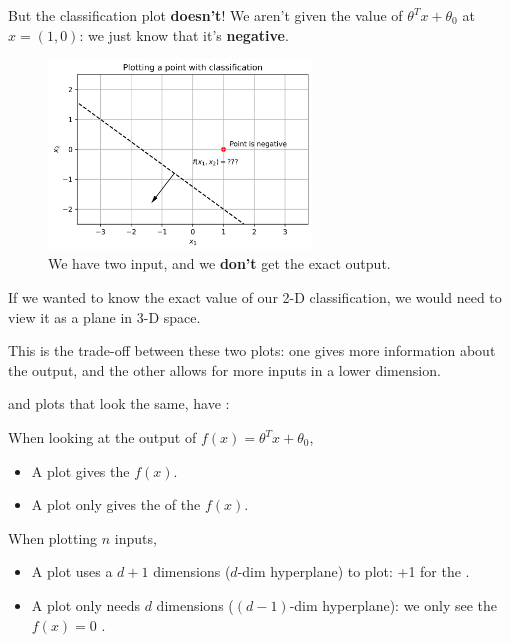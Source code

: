         But the classification plot \textbf{doesn't}! We aren't given the value of $\theta^Tx +\theta_0$ at $x=(1,0)$: we just know that it's \textbf{negative}.
        
        \begin{figure}[H]
            \centering
            
            \includegraphics[width=70mm,scale=0.5]{images/classification_images/2d_classification_plot.png}
            \caption*{We have two input, and we \textbf{don't} get the exact output.}
        \end{figure}
        
        If we wanted to know the exact value of our 2-D classification, we would need to view it as a plane in 3-D space.
        
        This is the trade-off between these two plots: one gives more information about the output, and the other allows for more inputs in a lower dimension.\\
        
        \begin{clarification}
             and  plots that look the same, have : 
            
            When looking at the output of $f(x)=\theta^T x + \theta_0$,
            \begin{itemize}
                \item A  plot gives the  $f(x)$.
                
                \item A  plot only gives the  of the $f(x)$.
            \end{itemize}
            
            When plotting $n$ inputs,
                \begin{itemize}
                    \item A  plot uses a $d+1$ dimensions ($d$-dim hyperplane) to plot: +1 for the .
                    \item A  plot only needs $d$ dimensions ($(d-1)$-dim hyperplane): we only see the $f(x)=0$ .
                \end{itemize}
        \end{clarification}
        
